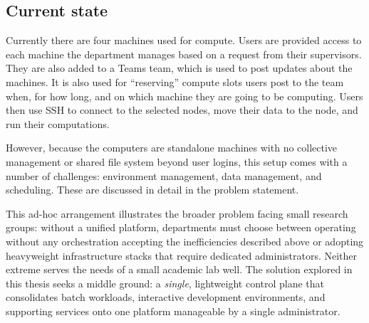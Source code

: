 \subsection{Current state}

Currently there are four machines used for compute. Users are provided access to each machine the department manages based on a request from their supervisors. They are also added to a Teams team, which is used to post updates about the machines. It is also used for ``reserving'' compute slots users post to the team when, for how long, and on which machine they are going to be computing. Users then use SSH to connect to the selected nodes, move their data to the node, and run their computations.

However, because the computers are standalone machines with no collective management or shared file system beyond user logins, this setup comes with a number of challenges: environment management, data management, and scheduling. These are discussed in detail in the problem statement.

This ad-hoc arrangement illustrates the broader problem facing small research groups: without a unified platform, departments must choose between operating without any orchestration accepting the inefficiencies described above or adopting heavyweight infrastructure stacks that require dedicated administrators. Neither extreme serves the needs of a small academic lab well. The solution explored in this thesis seeks a middle ground: a \emph{single}, lightweight control plane that consolidates batch workloads, interactive development environments, and supporting services onto one platform manageable by a single administrator.
